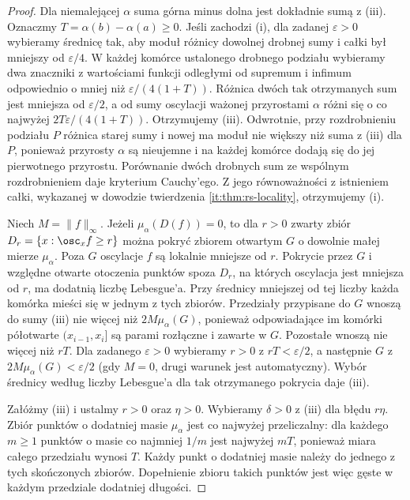 \begin{proof}
Dla niemalejącej $\alpha$ suma górna minus dolna jest dokładnie sumą z (iii). Oznaczmy $T=\alpha(b)-\alpha(a)\ge0$. Jeśli zachodzi (i), dla zadanej $\varepsilon>0$ wybieramy średnicę tak, aby moduł różnicy dowolnej drobnej sumy i całki był mniejszy od $\varepsilon/4$. W każdej komórce ustalonego drobnego podziału wybieramy dwa znaczniki z wartościami funkcji odległymi od supremum i infimum odpowiednio o mniej niż $\varepsilon/(4(1+T))$. Różnica dwóch tak otrzymanych sum jest mniejsza od $\varepsilon/2$, a od sumy oscylacji ważonej przyrostami $\alpha$ różni się o co najwyżej $2T\varepsilon/(4(1+T))$. Otrzymujemy (iii). Odwrotnie, przy rozdrobnieniu podziału $P$ różnica starej sumy i nowej ma moduł nie większy niż suma z (iii) dla $P$, ponieważ przyrosty $\alpha$ są nieujemne i na każdej komórce dodają się do jej pierwotnego przyrostu. Porównanie dwóch drobnych sum ze wspólnym rozdrobnieniem daje kryterium Cauchy'ego. Z jego równoważności z istnieniem całki, wykazanej w dowodzie twierdzenia \ref{it:thm:rs-locality}, otrzymujemy (i).

Niech $M=\|f\|_\infty$. Jeżeli $\mu_\alpha(D(f))=0$, to dla $r>0$ zwarty zbiór $D_r=\{x:\osc_x f\ge r\}$ można pokryć zbiorem otwartym $G$ o dowolnie małej mierze $\mu_\alpha$. Poza $G$ oscylacje $f$ są lokalnie mniejsze od $r$. Pokrycie przez $G$ i względne otwarte otoczenia punktów spoza $D_r$, na których oscylacja jest mniejsza od $r$, ma dodatnią liczbę Lebesgue'a. Przy średnicy mniejszej od tej liczby każda komórka mieści się w jednym z tych zbiorów. Przedziały przypisane do $G$ wnoszą do sumy (iii) nie więcej niż $2M\mu_\alpha(G)$, ponieważ odpowiadające im komórki półotwarte $(x_{i-1},x_i]$ są parami rozłączne i zawarte w $G$. Pozostałe wnoszą nie więcej niż $rT$. Dla zadanego $\varepsilon>0$ wybieramy $r>0$ z $rT<\varepsilon/2$, a następnie $G$ z $2M\mu_\alpha(G)<\varepsilon/2$ (gdy $M=0$, drugi warunek jest automatyczny). Wybór średnicy według liczby Lebesgue'a dla tak otrzymanego pokrycia daje (iii).

Załóżmy (iii) i ustalmy $r>0$ oraz $\eta>0$. Wybieramy $\delta>0$ z (iii) dla błędu $r\eta$. Zbiór punktów o dodatniej masie $\mu_\alpha$ jest co najwyżej przeliczalny: dla każdego $m\ge1$ punktów o masie co najmniej $1/m$ jest najwyżej $mT$, ponieważ miara całego przedziału wynosi $T$. Każdy punkt o dodatniej masie należy do jednego z tych skończonych zbiorów. Dopełnienie zbioru takich punktów jest więc gęste w każdym przedziale dodatniej długości.


\end{proof}
